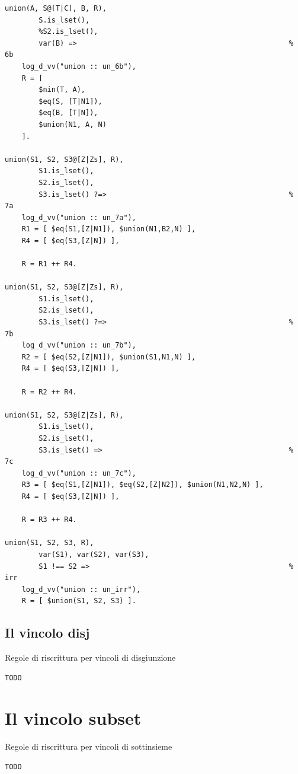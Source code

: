 \documentclass[12pt,a4paper,openright]{book} %
\begin{document}
\begin{verbatim}
union(A, S@[T|C], B, R),
        S.is_lset(),
        %S2.is_lset(), 
        var(B) =>                                                  % 6b
    log_d_vv("union :: un_6b"),
    R = [ 
        $nin(T, A), 
        $eq(S, [T|N1]), 
        $eq(B, [T|N]),
        $union(N1, A, N)  
    ].

union(S1, S2, S3@[Z|Zs], R),
        S1.is_lset(),
        S2.is_lset(),
        S3.is_lset() ?=>                                           % 7a
    log_d_vv("union :: un_7a"),
    R1 = [ $eq(S1,[Z|N1]), $union(N1,B2,N) ],
    R4 = [ $eq(S3,[Z|N]) ],

    R = R1 ++ R4.

union(S1, S2, S3@[Z|Zs], R),
        S1.is_lset(),
        S2.is_lset(),
        S3.is_lset() ?=>                                           % 7b
    log_d_vv("union :: un_7b"),
    R2 = [ $eq(S2,[Z|N1]), $union(S1,N1,N) ],
    R4 = [ $eq(S3,[Z|N]) ],

    R = R2 ++ R4.

union(S1, S2, S3@[Z|Zs], R),
        S1.is_lset(),
        S2.is_lset(),
        S3.is_lset() =>                                            % 7c
    log_d_vv("union :: un_7c"),
    R3 = [ $eq(S1,[Z|N1]), $eq(S2,[Z|N2]), $union(N1,N2,N) ],
    R4 = [ $eq(S3,[Z|N]) ],

    R = R3 ++ R4.

union(S1, S2, S3, R),
        var(S1), var(S2), var(S3),
        S1 !== S2 =>                                               % irr
    log_d_vv("union :: un_irr"),
    R = [ $union(S1, S2, S3) ].
\end{verbatim}

\clearpage

\subsection{Il vincolo disj}

\begin{algorithm}[H]
	\caption{Regole di riscrittura per vincoli di disgiunzione}
	\label{alg:disj_constraints}
\end{algorithm}
\begin{verbatim}
TODO
\end{verbatim}


\section{Il vincolo subset}

\begin{algorithm}[H]
	\caption{Regole di riscrittura per vincoli di sottinsieme}
	\label{alg:subset_constraints}
\end{algorithm}
\begin{verbatim}
TODO
\end{verbatim}
\end{document}
